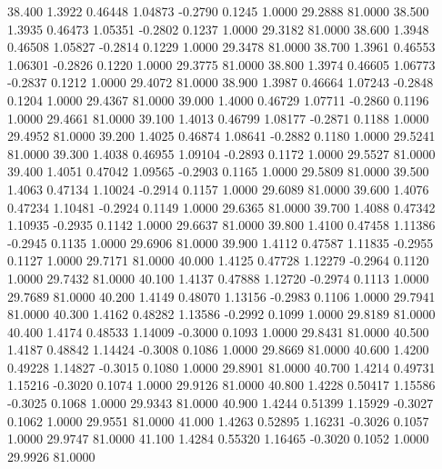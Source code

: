   38.400   1.3922   0.46448   1.04873  -0.2790   0.1245   1.0000  29.2888  81.0000
  38.500   1.3935   0.46473   1.05351  -0.2802   0.1237   1.0000  29.3182  81.0000
  38.600   1.3948   0.46508   1.05827  -0.2814   0.1229   1.0000  29.3478  81.0000
  38.700   1.3961   0.46553   1.06301  -0.2826   0.1220   1.0000  29.3775  81.0000
  38.800   1.3974   0.46605   1.06773  -0.2837   0.1212   1.0000  29.4072  81.0000
  38.900   1.3987   0.46664   1.07243  -0.2848   0.1204   1.0000  29.4367  81.0000
  39.000   1.4000   0.46729   1.07711  -0.2860   0.1196   1.0000  29.4661  81.0000
  39.100   1.4013   0.46799   1.08177  -0.2871   0.1188   1.0000  29.4952  81.0000
  39.200   1.4025   0.46874   1.08641  -0.2882   0.1180   1.0000  29.5241  81.0000
  39.300   1.4038   0.46955   1.09104  -0.2893   0.1172   1.0000  29.5527  81.0000
  39.400   1.4051   0.47042   1.09565  -0.2903   0.1165   1.0000  29.5809  81.0000
  39.500   1.4063   0.47134   1.10024  -0.2914   0.1157   1.0000  29.6089  81.0000
  39.600   1.4076   0.47234   1.10481  -0.2924   0.1149   1.0000  29.6365  81.0000
  39.700   1.4088   0.47342   1.10935  -0.2935   0.1142   1.0000  29.6637  81.0000
  39.800   1.4100   0.47458   1.11386  -0.2945   0.1135   1.0000  29.6906  81.0000
  39.900   1.4112   0.47587   1.11835  -0.2955   0.1127   1.0000  29.7171  81.0000
  40.000   1.4125   0.47728   1.12279  -0.2964   0.1120   1.0000  29.7432  81.0000
  40.100   1.4137   0.47888   1.12720  -0.2974   0.1113   1.0000  29.7689  81.0000
  40.200   1.4149   0.48070   1.13156  -0.2983   0.1106   1.0000  29.7941  81.0000
  40.300   1.4162   0.48282   1.13586  -0.2992   0.1099   1.0000  29.8189  81.0000
  40.400   1.4174   0.48533   1.14009  -0.3000   0.1093   1.0000  29.8431  81.0000
  40.500   1.4187   0.48842   1.14424  -0.3008   0.1086   1.0000  29.8669  81.0000
  40.600   1.4200   0.49228   1.14827  -0.3015   0.1080   1.0000  29.8901  81.0000
  40.700   1.4214   0.49731   1.15216  -0.3020   0.1074   1.0000  29.9126  81.0000
  40.800   1.4228   0.50417   1.15586  -0.3025   0.1068   1.0000  29.9343  81.0000
  40.900   1.4244   0.51399   1.15929  -0.3027   0.1062   1.0000  29.9551  81.0000
  41.000   1.4263   0.52895   1.16231  -0.3026   0.1057   1.0000  29.9747  81.0000
  41.100   1.4284   0.55320   1.16465  -0.3020   0.1052   1.0000  29.9926  81.0000
